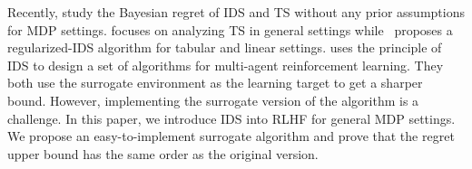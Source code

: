 Recently,  \citet{hao2022regret,moradipari2023improved} study the Bayesian regret of IDS and TS without any prior assumptions for MDP settings. \citet{moradipari2023improved} focuses on analyzing TS in general settings while~\citet{hao2022regret} proposes a regularized-IDS algorithm for tabular and linear settings. \citet{zhang2024provably} uses the principle of IDS to design a   set of algorithms for multi-agent reinforcement learning.
They both use the surrogate environment as the learning target to get a sharper bound. However,  implementing the surrogate version of the algorithm is a  challenge. In this paper, we introduce IDS into RLHF for general MDP settings. We propose an easy-to-implement surrogate algorithm and prove that the regret upper bound has the same order as the original version.